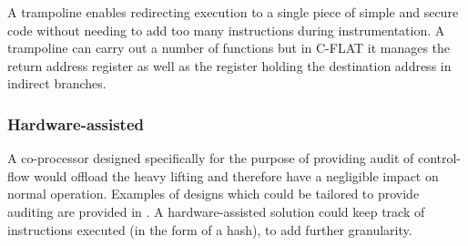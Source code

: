 A trampoline enables redirecting execution to a single piece of simple and secure code without needing to add too many instructions during instrumentation. A trampoline can carry out a number of functions but in C-FLAT \cite{Abera2016} it manages the return address register as well as the register holding the destination address in indirect branches. 

\subsubsection*{Hardware-assisted}

A co-processor designed specifically for the purpose of providing audit of control-flow would offload the heavy lifting and therefore have a negligible impact on normal operation. Examples of designs which could be tailored to provide auditing are provided in \cite{DeClercq2017}. A hardware-assisted solution could keep track of instructions executed (in the form of a hash), to add further granularity.